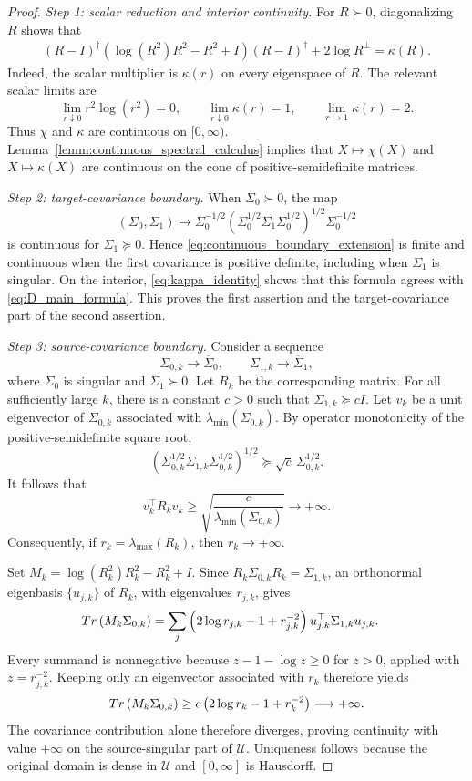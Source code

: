 \documentclass[10pt,a4paper]{amsart}
\newcommand{\Adag}[1]{#1^{\dagger}}
\newcommand{\Perp}[1]{#1^{\perp}}
\newcommand{\trace}[1]{\textnormal{Tr}\left({#1}\right)}
\begin{document}
\begin{proof}
\noindent\textit{Step 1: scalar reduction and interior continuity.}
For $R\succ0$, diagonalizing $R$ shows that
\begin{align}\label{eq:kappa_identity}
\Adag{(R-I)}\left(\log(R^2)R^2-R^2+I\right)\Adag{(R-I)}
+2\Perp{\log R}
=\kappa(R).
\end{align}
Indeed, the scalar multiplier is $\kappa(r)$ on every eigenspace of $R$. The relevant scalar limits are
\[
\lim_{r\downarrow0}r^2\log(r^2)=0,
\qquad
\lim_{r\downarrow0}\kappa(r)=1,
\qquad
\lim_{r\to1}\kappa(r)=2.
\]
Thus $\chi$ and $\kappa$ are continuous on $[0,\infty)$. Lemma~\ref{lemm:continuous_spectral_calculus} implies that $X\mapsto\chi(X)$ and $X\mapsto\kappa(X)$ are continuous on the cone of positive-semidefinite matrices.

\medskip
\noindent\textit{Step 2: target-covariance boundary.}
When $\Sigma_0\succ0$, the map
\[
(\Sigma_0,\Sigma_1)\longmapsto
\Sigma_0^{-1/2}\left(\Sigma_0^{1/2}\Sigma_1\Sigma_0^{1/2}\right)^{1/2}\Sigma_0^{-1/2}
\]
is continuous for $\Sigma_1\succeq0$. Hence \eqref{eq:continuous_boundary_extension} is finite and continuous when the first covariance is positive definite, including when $\Sigma_1$ is singular. On the interior, \eqref{eq:kappa_identity} shows that this formula agrees with \eqref{eq:D_main_formula}. This proves the first assertion and the target-covariance part of the second assertion.

\medskip
\noindent\textit{Step 3: source-covariance boundary.}
Consider a sequence
\[
\Sigma_{0,k}\to\overline{\Sigma}_0,
\qquad
\Sigma_{1,k}\to\overline{\Sigma}_1,
\]
where $\overline{\Sigma}_0$ is singular and $\overline{\Sigma}_1\succ0$. Let $R_k$ be the corresponding matrix. For all sufficiently large $k$, there is a constant $c>0$ such that $\Sigma_{1,k}\succeq cI$. Let $v_k$ be a unit eigenvector of $\Sigma_{0,k}$ associated with $\lambda_{\min}(\Sigma_{0,k})$. By operator monotonicity of the positive-semidefinite square root,
\[
\left(\Sigma_{0,k}^{1/2}\Sigma_{1,k}\Sigma_{0,k}^{1/2}\right)^{1/2}
\succeq\sqrt{c}\,\Sigma_{0,k}^{1/2}.
\]
It follows that
\[
v_k^\top R_kv_k
\geq\sqrt{\frac{c}{\lambda_{\min}(\Sigma_{0,k})}}
\longrightarrow+\infty.
\]
Consequently, if $r_k=\lambda_{\max}(R_k)$, then $r_k\to+\infty$.

Set $M_k=\log(R_k^2)R_k^2-R_k^2+I$. Since $R_k\Sigma_{0,k}R_k=\Sigma_{1,k}$, an orthonormal eigenbasis $\{u_{j,k}\}$ of $R_k$, with eigenvalues $r_{j,k}$, gives
\begin{align*}
\trace{M_k\Sigma_{0,k}}
&=\sum_j\left(2\log r_{j,k}-1+r_{j,k}^{-2}\right)u_{j,k}^\top\Sigma_{1,k}u_{j,k}.
\end{align*}
Every summand is nonnegative because $z-1-\log z\geq0$ for $z>0$, applied with $z=r_{j,k}^{-2}$. Keeping only an eigenvector associated with $r_k$ therefore yields
\[
\trace{M_k\Sigma_{0,k}}
\geq c\left(2\log r_k-1+r_k^{-2}\right)
\longrightarrow+\infty.
\]
The covariance contribution alone therefore diverges, proving continuity with value $+\infty$ on the source-singular part of $\mathcal{U}$. Uniqueness follows because the original domain is dense in $\mathcal{U}$ and $[0,\infty]$ is Hausdorff.


\end{proof}
\end{document}
